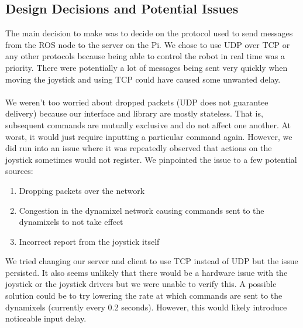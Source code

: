 \documentclass[]{article}
\begin{document}
\subsection{Design Decisions and Potential Issues}
The main decision to make was to decide on the protocol used to send messages from the ROS node to the server on the Pi. We chose to use UDP over TCP or any other protocols because being able to control the robot in real time was a priority. There were potentially a lot of messages being sent very quickly when moving the joystick and using TCP could have caused some unwanted delay.
\\
\\
We weren't too worried about dropped packets (UDP does not guarantee delivery) because our interface and library are mostly stateless. That is, subsequent commands are mutually exclusive and do not affect one another. At worst, it would just require inputting a particular command again. However, we did run into an issue where it was repeatedly observed that actions on the joystick sometimes would not register. We pinpointed the issue to a few potential sources:
\begin{enumerate}
  \item Dropping packets over the network
  \item Congestion in the dynamixel network causing commands sent to the dynamixels to not take effect
  \item Incorrect report from the joystick itself
\end{enumerate}
We tried changing our server and client to use TCP instead of UDP but the issue persisted. It also seems unlikely that there would be a hardware issue with the joystick or the joystick drivers but we were unable to verify this. A possible solution could be to try lowering the rate at which commands are sent to the dynamixels (currently every 0.2 seconds). However, this would likely introduce noticeable input delay.
\end{document}
